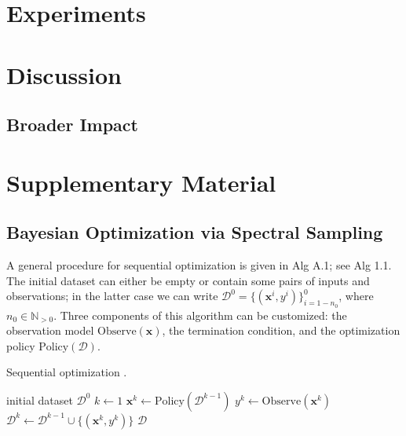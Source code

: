 \documentclass{article}
\begin{document}
\section{Experiments}

\section{Discussion}

\subsection{Broader Impact}


\section{Supplementary Material}

\subsection{Bayesian Optimization via Spectral Sampling}

A general procedure for sequential optimization is given in Alg A.1; see
\cite{Garnett2023} Alg 1.1. The initial dataset can either be empty or
contain some pairs of inputs and observations; in the latter case we can
write $\mathcal{D}^0 = \{(\mathbf{x}^i, y^i)\}_{i=1-n_0}^0$, where
$n_0 \in \mathbb{N}_{>0}$. Three components of this algorithm can be
customized: the observation model $\mathrm{Observe}(\mathbf{x})$, the
termination condition, and the optimization policy
$\mathrm{Policy}(\mathcal{D})$.

\begin{algorithm}[h]
  \caption{Sequential optimization \cite{Garnett2023}.}
  \label{alg:seqopt}
  \begin{algorithmic}[1] %
    \Input initial dataset $\mathcal{D}^0$
    \State $k \gets 1$
     \Repeat
      \State $\mathbf{x}^k \gets \mathrm{Policy}(\mathcal{D}^{k-1})$
      \State $y^k \gets \mathrm{Observe}(\mathbf{x}^k)$ 
      \State $\mathcal{D}^k \gets \mathcal{D}^{k-1} \cup \{(\mathbf{x}^k, y^k)\}$
    \Output  $\mathcal{D}$
  \end{algorithmic}
\end{algorithm}
\end{document}
